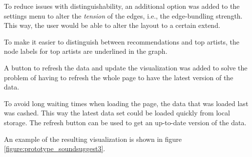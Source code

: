 
To reduce issues with distinguishability, an additional option was added to the settings menu to alter the \emph{tension} of the edges, i.e., the edge-bundling strength. This way, the user would be able to alter the layout to a certain extend.

To make it easier to distinguish between recommendations and top artists, the node labels for top artists are underlined in the graph.

A button to refresh the data and update the visualization was added to solve the problem of having to refresh the whole page to have the latest version of the data.

To avoid long waiting times when loading the page, the data that was loaded last was cashed. This way the latest data set could be loaded quickly from local storage. The refresh button can be used to get an up-to-date version of the data.

An example of the resulting visualization is shown in figure \ref{figure:prototype_soundsuggest3}.

